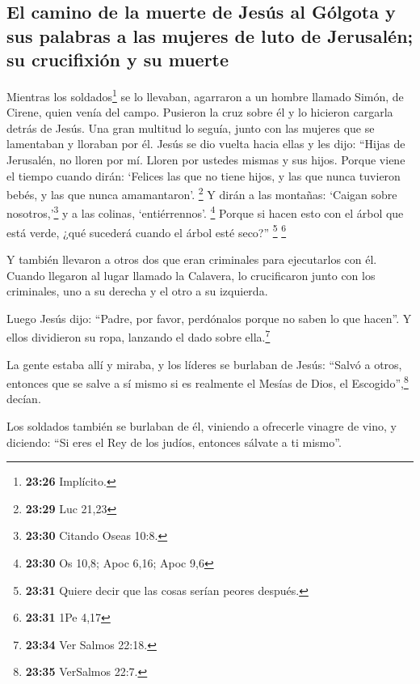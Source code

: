 \hypertarget{el-camino-de-la-muerte-de-jesuxfas-al-guxf3lgota-y-sus-palabras-a-las-mujeres-de-luto-de-jerusaluxe9n-su-crucifixiuxf3n-y-su-muerte}{%
\subsection{El camino de la muerte de Jesús al Gólgota y sus palabras a
las mujeres de luto de Jerusalén; su crucifixión y su
muerte}\label{el-camino-de-la-muerte-de-jesuxfas-al-guxf3lgota-y-sus-palabras-a-las-mujeres-de-luto-de-jerusaluxe9n-su-crucifixiuxf3n-y-su-muerte}}

 Mientras los soldados\footnote{\textbf{23:26} Implícito.}
se lo llevaban, agarraron a un hombre llamado Simón, de Cirene, quien
venía del campo. Pusieron la cruz sobre él y lo hicieron cargarla detrás
de Jesús.  Una gran multitud lo seguía, junto con las
mujeres que se lamentaban y lloraban por él.  Jesús se
dio vuelta hacia ellas y les dijo: ``Hijas de Jerusalén, no lloren por
mí. Lloren por ustedes mismas y sus hijos.  Porque viene
el tiempo cuando dirán: `Felices las que no tiene hijos, y las que nunca
tuvieron bebés, y las que nunca amamantaron'. \footnote{\textbf{23:29}
  Luc 21,23}  Y dirán a las montañas: `Caigan sobre
nosotros,'\footnote{\textbf{23:30} Citando Oseas 10:8.} y a las colinas,
`entiérrennos'. \footnote{\textbf{23:30} Os 10,8; Apoc 6,16; Apoc 9,6}
 Porque si hacen esto con el árbol que está verde, ¿qué
sucederá cuando el árbol esté seco?'' \footnote{\textbf{23:31} Quiere
  decir que las cosas serían peores después.} \footnote{\textbf{23:31}
  1Pe 4,17}

 Y también llevaron a otros dos que eran criminales para
ejecutarlos con él.  Cuando llegaron al lugar llamado la
Calavera, lo crucificaron junto con los criminales, uno a su derecha y
el otro a su izquierda.

 Luego Jesús dijo: ``Padre, por favor, perdónalos porque
no saben lo que hacen''. Y ellos dividieron su ropa, lanzando el dado
sobre ella.\footnote{\textbf{23:34} Ver Salmos 22:18.}

 La gente estaba allí y miraba, y los líderes se burlaban
de Jesús: ``Salvó a otros, entonces que se salve a sí mismo si es
realmente el Mesías de Dios, el Escogido'',\footnote{\textbf{23:35}
  VerSalmos 22:7.} decían.

 Los soldados también se burlaban de él, viniendo a
ofrecerle vinagre de vino, y diciendo:  ``Si eres el Rey
de los judíos, entonces sálvate a ti mismo''.

